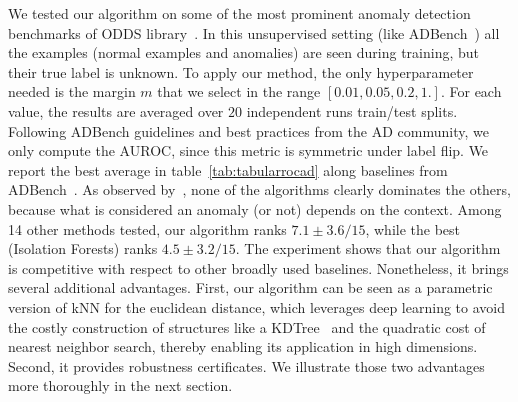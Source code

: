 We tested our algorithm on some of the most prominent anomaly detection benchmarks of ODDS library~\cite{Rayana:2016}. In this unsupervised setting (like ADBench~\cite{han_adbench_nodate}) all the examples (normal examples and anomalies) are seen during training, but their true label is unknown. To apply our method, the only hyperparameter needed is the margin $m$ that we select in the range $[0.01, 0.05, 0.2, 1.]$. For each value, the results are averaged over $20$ independent runs train/test splits. Following ADBench guidelines and best practices from the AD community, we only compute the AUROC, since this metric is symmetric under label flip. We report the best average in table~\ref{tab:tabularrocad} along baselines from ADBench~\cite{han_adbench_nodate}. As observed by~\cite{han_adbench_nodate}, none of the algorithms clearly dominates the others, because what is considered an anomaly (or not) depends on the context. Among 14 other methods tested, our algorithm ranks $7.1 \pm 3.6 / 15$, while the best (Isolation Forests) ranks $4.5 \pm 3.2 / 15$. The experiment shows that our algorithm is competitive with respect to other broadly used baselines. Nonetheless, it brings several additional advantages. First, our algorithm can be seen as a parametric version of kNN for the euclidean distance, which leverages deep learning to avoid the costly construction of structures like a KDTree~\cite{maneewongvatana1999analysis} and the quadratic cost of nearest neighbor search, thereby enabling its application in high dimensions. Second, it provides robustness certificates. We illustrate those two advantages more thoroughly in the next section.


\begin{table}[!ht]
    \small
    \centering
    \caption{Lower bound on the Local Lipschitz Constant (LLC) of conventional network after $10,000$ training steps for each toy example. It is the maximum of $\|\nabla_{x_i}f(x_i)\|$ over the train set.}
    \label{tab:llc_main}
\end{table}



